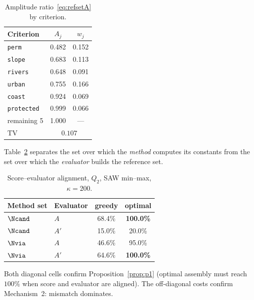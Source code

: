 \begin{table}[t]
\centering
\caption{Amplitude ratio~\eqref{eq:refsetA} by criterion.}
\label{tab:amprefset}
\begin{tabular}{lcc}
\toprule
Criterion & $A_j$ & $w_j$ \\
\midrule
\texttt{perm}      & 0.482 & 0.152 \\
\texttt{slope}     & 0.683 & 0.113 \\
\texttt{rivers}    & 0.648 & 0.091 \\
\texttt{urban}     & 0.755 & 0.166 \\
\texttt{coast}     & 0.924 & 0.069 \\
\texttt{protected} & 0.999 & 0.066 \\
remaining 5        & 1.000 & ---   \\
\midrule
$\mathrm{TV}$      & \multicolumn{2}{c}{$0.107$} \\
\bottomrule
\end{tabular}
\end{table}

Table~\ref{tab:fourthcell} separates the set over which the
\emph{method} computes its constants from the set over which the
\emph{evaluator} builds the reference set.

\begin{table}[t]
\centering
\caption{Score--evaluator alignment, $Q_2$, SAW min--max, $\kappa=200$.}
\label{tab:fourthcell}
\begin{tabular}{llcc}
\toprule
Method set & Evaluator & greedy & optimal \\
\midrule
$\Ncand$ & $A$  & 68.4\% & \textbf{100.0\%} \\
$\Ncand$ & $A'$ & 15.0\% &  20.0\% \\
$\Nvia$  & $A$  & 46.6\% &  95.0\% \\
$\Nvia$  & $A'$ & 64.6\% & \textbf{100.0\%} \\
\bottomrule
\end{tabular}
\end{table}

Both diagonal cells confirm Proposition~\ref{prop:p1} (optimal assembly
must reach $100\%$ when score and evaluator are aligned).
The off-diagonal costs confirm Mechanism~2: mismatch dominates.
